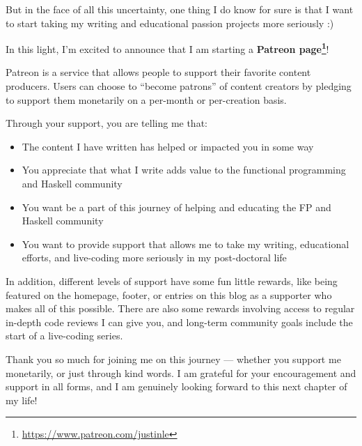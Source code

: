 \documentclass[]{article}
\renewcommand{\href}[2]{#2\footnote{\url{#1}}}
\begin{document}
But in the face of all this uncertainty, one thing I do know for sure is that I
want to start taking my writing and educational passion projects more seriously
:)

In this light, I'm excited to announce that I am starting a
\textbf{\href{https://www.patreon.com/justinle}{Patreon page}}!

Patreon is a service that allows people to support their favorite content
producers. Users can choose to ``become patrons'' of content creators by
pledging to support them monetarily on a per-month or per-creation basis.

Through your support, you are telling me that:

\begin{itemize}
\tightlist
\item
  The content I have written has helped or impacted you in some way
\item
  You appreciate that what I write adds value to the functional programming and
  Haskell community
\item
  You want be a part of this journey of helping and educating the FP and Haskell
  community
\item
  You want to provide support that allows me to take my writing, educational
  efforts, and live-coding more seriously in my post-doctoral life
\end{itemize}

In addition, different levels of support have some fun little rewards, like
being featured on the homepage, footer, or entries on this blog as a supporter
who makes all of this possible. There are also some rewards involving access to
regular in-depth code reviews I can give you, and long-term community goals
include the start of a live-coding series.

Thank you so much for joining me on this journey --- whether you support me
monetarily, or just through kind words. I am grateful for your encouragement and
support in all forms, and I am genuinely looking forward to this next chapter of
my life!
\end{document}
